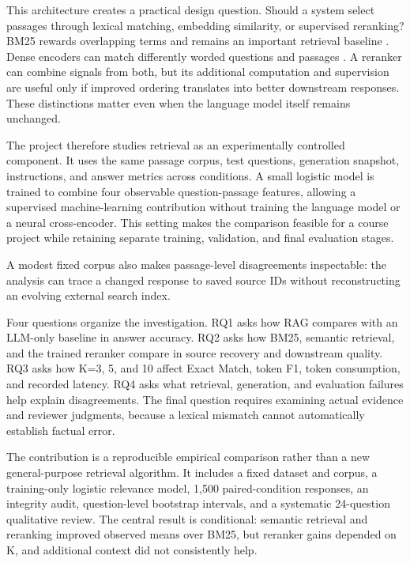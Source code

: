 \documentclass[
  11pt,
]{article}
\begin{document}
This architecture creates a practical design question. Should a system
select passages through lexical matching, embedding similarity, or
supervised reranking? BM25 rewards overlapping terms and remains an
important retrieval baseline \citep{bm25}. Dense encoders can match
differently worded questions and passages \citep{dpr}. A reranker can
combine signals from both, but its additional computation and
supervision are useful only if improved ordering translates into better
downstream responses. These distinctions matter even when the language
model itself remains unchanged.

The project therefore studies retrieval as an experimentally controlled
component. It uses the same passage corpus, test questions, generation
snapshot, instructions, and answer metrics across conditions. A small
logistic model is trained to combine four observable question-passage
features, allowing a supervised machine-learning contribution without
training the language model or a neural cross-encoder. This setting
makes the comparison feasible for a course project while retaining
separate training, validation, and final evaluation stages.

A modest fixed corpus also makes passage-level disagreements
inspectable: the analysis can trace a changed response to saved source
IDs without reconstructing an evolving external search index.

Four questions organize the investigation. RQ1 asks how RAG compares
with an LLM-only baseline in answer accuracy. RQ2 asks how BM25,
semantic retrieval, and the trained reranker compare in source recovery
and downstream quality. RQ3 asks how K=3, 5, and 10 affect Exact Match,
token F1, token consumption, and recorded latency. RQ4 asks what
retrieval, generation, and evaluation failures help explain
disagreements. The final question requires examining actual evidence and
reviewer judgments, because a lexical mismatch cannot automatically
establish factual error.

The contribution is a reproducible empirical comparison rather than a
new general-purpose retrieval algorithm. It includes a fixed dataset and
corpus, a training-only logistic relevance model, 1,500 paired-condition
responses, an integrity audit, question-level bootstrap intervals, and a
systematic 24-question qualitative review. The central result is
conditional: semantic retrieval and reranking improved observed means
over BM25, but reranker gains depended on K, and additional context did
not consistently help.
\end{document}
